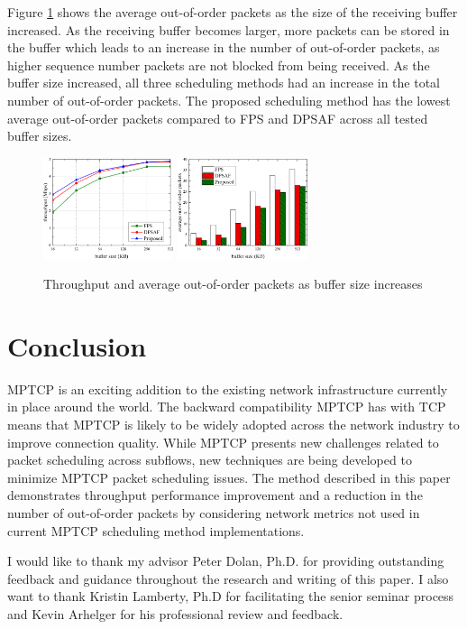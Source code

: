 \documentclass[sigplan,screen,nonacm]{acmart}
\begin{document}
Figure \ref{fig:buffer-size-increase} shows the average out-of-order packets as the size of the receiving buffer increased. As the receiving buffer becomes larger, more packets can be stored in the buffer which leads to an increase in the number of out-of-order packets, as higher sequence number packets are not blocked from being received. As the buffer size increased, all three scheduling methods had an increase in the total number of out-of-order packets. The proposed scheduling method has the lowest average out-of-order packets compared to FPS and DPSAF across all tested buffer sizes.
\begin{figure}
\centering
\includegraphics[width=1.5in]{mptcp_paper/assets/throughput.png}
\includegraphics[width=1.5in]{mptcp_paper/assets/buffer-size.png}
\caption{Throughput and average out-of-order packets as buffer size increases \cite{NewMethod:2018}}
\label{fig:buffer-size-increase}
\end{figure}

\section{Conclusion}
\label{sec:conclusion}

MPTCP is an exciting addition to the existing network infrastructure currently in place around the world. The backward compatibility MPTCP has with TCP means that MPTCP is likely to be widely adopted across the network industry to improve connection quality. While MPTCP presents new challenges related to packet scheduling across subflows, new techniques are being developed to minimize MPTCP packet scheduling issues. The method described in this paper demonstrates throughput performance improvement and a reduction in the number of out-of-order packets by considering network metrics not used in current MPTCP scheduling method implementations.

\begin{acks}
I would like to thank my advisor Peter Dolan, Ph.D. for providing outstanding feedback and guidance throughout the research and writing of this paper. I also want to thank Kristin Lamberty, Ph.D for facilitating the senior seminar process and Kevin Arhelger for his professional review and feedback.
\end{acks}



\end{document}
